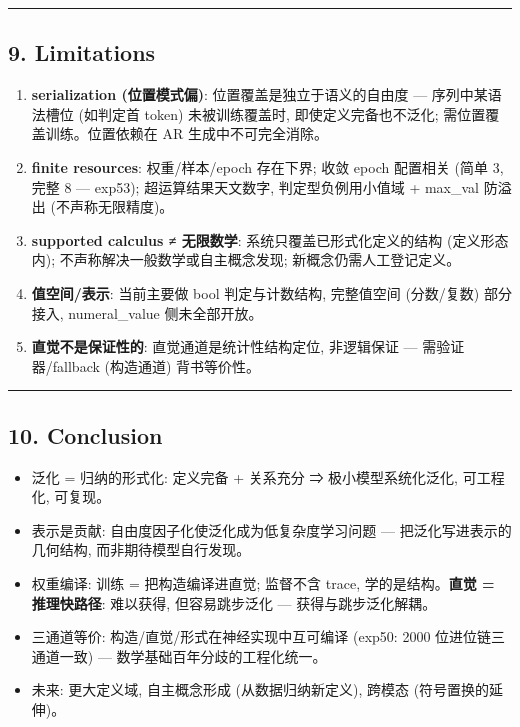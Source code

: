 \documentclass[
]{article}
\providecommand{\tightlist}{%
  \setlength{\itemsep}{0pt}\setlength{\parskip}{0pt}}
\begin{document}
\begin{center}\rule{0.5\linewidth}{0.5pt}\end{center}

\subsection{9. Limitations}\label{limitations}

\begin{enumerate}
\def\labelenumi{\arabic{enumi}.}
\tightlist
\item
  \textbf{serialization (位置模式偏)}: 位置覆盖是独立于语义的自由度 ---
  序列中某语法槽位 (如判定首 token) 未被训练覆盖时,
  即使定义完备也不泛化; 需位置覆盖训练。位置依赖在 AR
  生成中不可完全消除。
\item
  \textbf{finite resources}: 权重/样本/epoch 存在下界; 收敛 epoch
  配置相关 (简单 3, 完整 8 --- exp53); 超运算结果天文数字,
  判定型负例用小值域 + max\_val 防溢出 (不声称无限精度)。
\item
  \textbf{supported calculus ≠ 无限数学}: 系统只覆盖已形式化定义的结构
  (定义形态内); 不声称解决一般数学或自主概念发现;
  新概念仍需人工登记定义。
\item
  \textbf{值空间/表示}: 当前主要做 bool 判定与计数结构, 完整值空间
  (分数/复数) 部分接入, numeral\_value 侧未全部开放。
\item
  \textbf{直觉不是保证性的}: 直觉通道是统计性结构定位, 非逻辑保证 ---
  需验证器/fallback (构造通道) 背书等价性。
\end{enumerate}

\begin{center}\rule{0.5\linewidth}{0.5pt}\end{center}

\subsection{10. Conclusion}\label{conclusion}

\begin{itemize}
\tightlist
\item
  泛化 = 归纳的形式化: 定义完备 + 关系充分 ⇒ 极小模型系统化泛化,
  可工程化, 可复现。
\item
  表示是贡献: 自由度因子化使泛化成为低复杂度学习问题 ---
  把泛化写进表示的几何结构, 而非期待模型自行发现。
\item
  权重编译: 训练 = 把构造编译进直觉; 监督不含 trace,
  学的是结构。\textbf{直觉 = 推理快路径}: 难以获得, 但容易跳步泛化 ---
  获得与跳步泛化解耦。
\item
  三通道等价: 构造/直觉/形式在神经实现中互可编译 (exp50: 2000
  位进位链三通道一致) --- 数学基础百年分歧的工程化统一。
\item
  未来: 更大定义域, 自主概念形成 (从数据归纳新定义), 跨模态
  (符号置换的延伸)。
\end{itemize}
\end{document}
